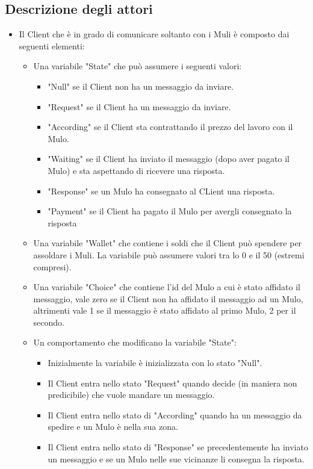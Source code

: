 \documentclass[13pt,a4paper]{article}
\begin{document}
	\subsection{Descrizione degli attori}
	\begin{itemize}
		\item Il Client che è in grado di comunicare soltanto con i Muli è composto dai seguenti elementi:
				  \begin{itemize}
					\item Una variabile "State" che può assumere i seguenti valori:
							\begin{itemize}
								\item "Null" se il Client non ha un messaggio da inviare.
								\item "Request" se il Client ha un messaggio da inviare.
								\item "According" se il Client sta contrattando il prezzo del lavoro con il Mulo.
								\item "Waiting" se il Client ha inviato il messaggio (dopo aver pagato il Mulo) e sta aspettando di ricevere una risposta.
								\item "Response" se un Mulo ha consegnato al CLient una risposta.
								\item "Payment" se il Client ha pagato il Mulo per avergli consegnato la risposta
							\end{itemize}
						\item Una variabile "Wallet" che contiene i soldi che il Client può spendere per assoldare i Muli. La variabile può assumere valori tra lo 0 e il 50 (estremi compresi).
						\item Una variabile "Choice" che contiene l'id del Mulo a cui è stato affidato il messaggio, vale zero se il Client non ha  affidato il messaggio ad un Mulo, altrimenti vale 1 se il messaggio è stato affidato al primo Mulo, 2 per il secondo.
						\item Un comportamento che modificano la variabile "State":
						\begin{itemize}
							\item Inizialmente la variabile è inizializzata con lo stato "Null".
							\item Il Client entra nello stato "Request" quando decide (in maniera non predicibile) che vuole mandare un messaggio.
							\item Il Client entra nello stato di "According" quando ha un messaggio da spedire e un Mulo è nella sua zona.
							\item Il Client entra nello stato di "Response" se precedentemente ha inviato un messaggio e se un Mulo nelle sue vicinanze li consegna la risposta.

\end{itemize}
\end{itemize}
\end{itemize}
\end{document}
